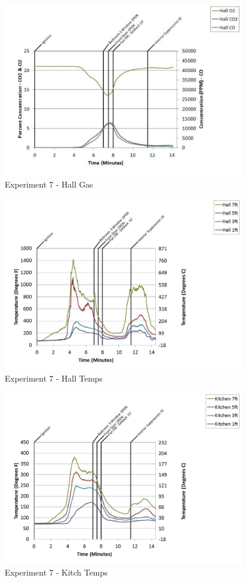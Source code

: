 \documentclass{article}
\begin{document}
\begin{appendices}
	\clearpage

	\begin{figure}[h!]
		\centering
		\includegraphics[height=3.05in]{0_Images/Results_Charts/Exp_7_Charts/HallGas.pdf}
		\caption{Experiment 7 - Hall Gas}
	\end{figure}
 

	\begin{figure}[h!]
		\centering
		\includegraphics[height=3.05in]{0_Images/Results_Charts/Exp_7_Charts/HallTemps.pdf}
		\caption{Experiment 7 - Hall Temps}
	\end{figure}
 
	\clearpage

	\begin{figure}[h!]
		\centering
		\includegraphics[height=3.05in]{0_Images/Results_Charts/Exp_7_Charts/KitchTemps.pdf}
		\caption{Experiment 7 - Kitch Temps}
	\end{figure}
 


\end{appendices}
\end{document}

